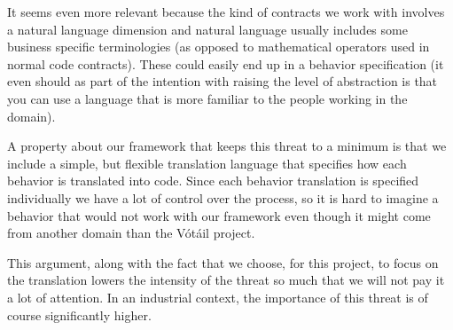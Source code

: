 It seems even more relevant because the kind of contracts we work with involves a natural language dimension and natural language usually includes some business specific terminologies (as opposed to mathematical operators used in normal code contracts). These could easily end up in a behavior specification (it even should as part of the intention with raising the level of abstraction is that you can use a language that is more familiar to the people working in the domain).
 
A property about our framework that keeps this threat to a minimum is that we include a simple, but flexible translation language that specifies how each behavior is translated into code. Since each behavior translation is specified individually we have a lot of control over the process, so it is hard to imagine a behavior that would not work with our framework even though it might come from another domain than the V\'{o}t\'{a}il project.
 
This argument, along with the fact that we choose, for this project, to focus on the translation lowers the intensity of the threat so much that we will not pay it a lot of attention. In an industrial context, the importance of this threat is of course significantly higher.